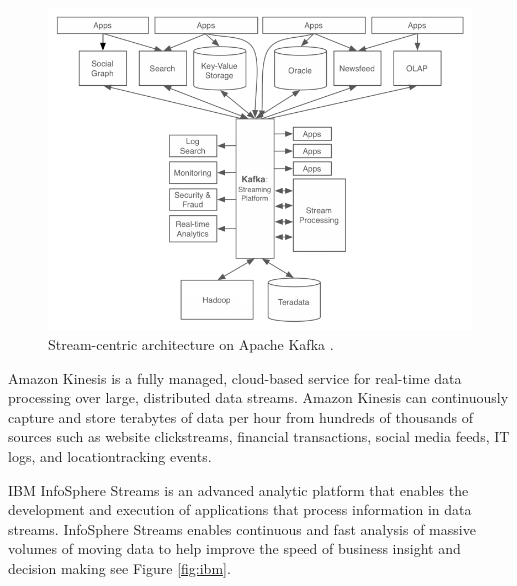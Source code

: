 \documentclass[twoside,12pt, a4paper]{report}
\begin{document}
\begin{figure}[!h]
	\centering
	\includegraphics[width=1\linewidth]{figures/data-flow-768x584.png}
	\caption{Stream-centric architecture on Apache Kafka \cite{Kafka}.}
	\label{fig:kafka}
\end{figure}

Amazon Kinesis \cite{kinesis} is a fully managed, cloud-based
service for real-time data processing over large, distributed
data streams. Amazon Kinesis can continuously capture and
store terabytes of data per hour from hundreds of thousands
of sources such as website clickstreams, financial
transactions, social media feeds, IT logs, and locationtracking
events.



IBM InfoSphere Streams \cite{ballard2014ibm,ibmdoc} is an advanced analytic
platform that enables the development and execution
of applications that process information in data streams.
InfoSphere Streams enables continuous and fast analysis of massive volumes
of moving data to help improve the speed of business insight and decision making see Figure \ref{fig:ibm}.
\end{document}

